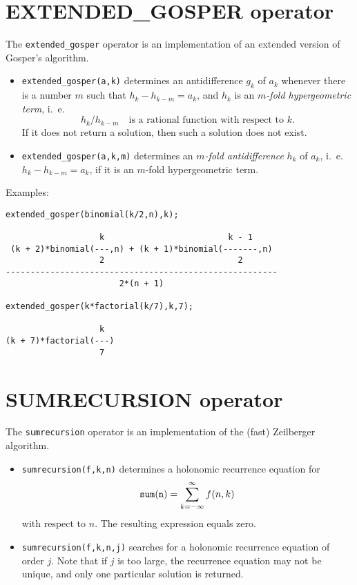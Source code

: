 \section{EXTENDED\_GOSPER operator}

The {\tt extended\_gosper} operator is an
implementation of an extended version of Gosper's algorithm.

\begin{itemize}
\item
{\tt extended\_gosper(a,k)} determines an antidifference $g_k$ of $a_k$
whenever there is a number $m$ such that $h_{k}-h_{k-m}=a_k$, and $h_k$ is an
{\sl $m$-fold hypergeometric term}, i.\ e.
\[
h_{k}/h_{k-m}\quad\mbox{is a rational function with respect to $k$.}
\]
If it does not return a solution, then such a solution does not exist.
\item
{\tt extended\_gosper(a,k,m)} 
determines an {\sl $m$-fold antidifference} $h_k$ of $a_k$,
i.\ e.\ $h_{k}-h_{k-m}=a_k$, if it is an $m$-fold hypergeometric term.
\end{itemize}

Examples:

\begin{verbatim}
extended_gosper(binomial(k/2,n),k);

                   k                         k - 1
 (k + 2)*binomial(---,n) + (k + 1)*binomial(-------,n)
                   2                           2
-------------------------------------------------------
                       2*(n + 1)

extended_gosper(k*factorial(k/7),k,7);

                   k
(k + 7)*factorial(---)
                   7
\end{verbatim}

\section{SUMRECURSION operator}

The {\tt sumrecursion} operator is an
implementation of the (fast) Zeilberger algorithm.
\begin{itemize}
\item
{\tt sumrecursion(f,k,n)} determines a holonomic recurrence equation
for 
\[
{\tt sum(n)} =\sum\limits_{k=-\infty}^\infty f(n,k)
\]
with respect to $n$. %
The resulting expression equals zero.
\item
{\tt sumrecursion(f,k,n,j)}
searches for a holonomic recurrence equation of order $j$.%
Note that if $j$ is too large, the recurrence equation
may not be unique, and only one particular solution is returned.
\end{itemize}

